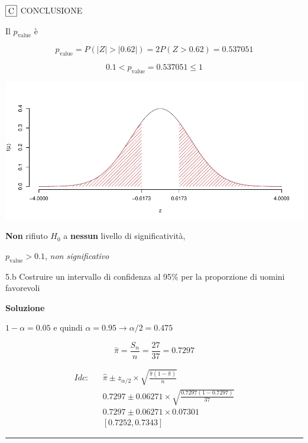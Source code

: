 \documentclass[
  11pt,
]{book}
\theoremstyle{mytheoremstyle}
\theoremstyle{mydefstyle}
\begin{document}
\(\fbox{C}\) CONCLUSIONE

Il \(p_{\text{value}}\) è

\[ p_{\text{value}} = P(|Z|>|0.62|)=2P(Z>0.62)=0.537051 \]

\[
 0.1 < p_\text{value}= 0.537051 \leq 1 
\]

\begin{center}\includegraphics{Appunti_di_Statistica_2025_files/figure-latex/25-test-functions-24-1} \end{center}

\textbf{Non} rifiuto \(H_0\) a \textbf{nessun}
livello di significatività,

\(p_\text{value}>0.1\),
\emph{non significativo}

5.b Costruire un intervallo di confidenza al 95\% per la proporzione di uomini
favorevoli

\textbf{Soluzione}

\(1-\alpha =0.05\) e quindi \(\alpha=0.95\rightarrow \alpha/2=0.475\)

\[
  \hat\pi = \frac{S_n}n = \frac{ 27 }{ 37 }= 0.7297 
\]

\begin{eqnarray*}
  Idc: & &  \hat\pi \pm  z_{\alpha/2} \times \sqrt{\frac{\hat\pi(1-\hat\pi)}{n}} \\
     & &  0.7297 \pm  0.06271 \times \sqrt{\frac{ 0.7297 (1- 0.7297 )}{ 37 }} \\
     & &  0.7297 \pm  0.06271 \times  0.07301 \\
     & & [ 0.7252 ,  0.7343 ]
\end{eqnarray*}

\begin{center}\rule{0.5\linewidth}{0.5pt}\end{center}
\end{document}
